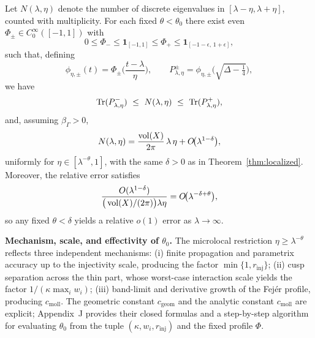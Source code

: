 \begin{theorem}\label{thm:local-weyl}
Let $N(\lambda,\eta)$ denote the number of discrete eigenvalues in $[\lambda-\eta,\lambda+\eta]$, counted with multiplicity. For each fixed $\theta<\theta_0$ there exist even $\Phi_\pm\in C_0^\infty([-1,1])$ with
\[
0\le\Phi_-\le\mathbf{1}_{[-1,1]}\le\Phi_+\le\mathbf{1}_{[-1-\epsilon,\,1+\epsilon]},
\]
such that, defining
\[
\phi_{\eta,\pm}(t)=\Phi_\pm\!\Big(\frac{t-\lambda}{\eta}\Big),\qquad 
P^\pm_{\lambda,\eta}=\phi_{\eta,\pm}\!\Big(\sqrt{\Delta-\tfrac14}\Big),
\]
we have
\begin{equation}\label{eq:tauber}
\Tr(P^-_{\lambda,\eta})\ \le\ N(\lambda,\eta)\ \le\ \Tr(P^+_{\lambda,\eta}),
\end{equation}
and, assuming $\beta_\Gamma>0$,
\begin{equation}\label{eq:local-weyl}
N(\lambda,\eta) = \frac{\operatorname{vol}(X)}{2\pi}\,\lambda\,\eta + O\!\big(\lambda^{1-\delta}\big),
\end{equation}
uniformly for $\eta\in[\lambda^{-\theta},1]$, with the same $\delta>0$ as in Theorem~\ref{thm:localized}. Moreover, the relative error satisfies
\begin{equation}\label{eq:relative}
\frac{O(\lambda^{1-\delta})}{\big(\operatorname{vol}(X)/(2\pi)\big)\lambda\eta} = O\!\big(\lambda^{-\delta+\theta}\big),
\end{equation}
so any fixed $\theta<\delta$ yields a relative $o(1)$ error as $\lambda\to\infty$.
\end{theorem}

\medskip
\noindent\textbf{Mechanism, scale, and effectivity of $\theta_0$.}
The microlocal restriction $\eta\ge\lambda^{-\theta}$ reflects three independent mechanisms:
(i) finite propagation and parametrix accuracy up to the injectivity scale, producing the factor $\min\{1,r_{\mathrm{inj}}\}$;
(ii) cusp separation across the thin part, whose worst-case interaction scale yields the factor $1/(\kappa\max_i w_i)$;
(iii) band-limit and derivative growth of the Fejér profile, producing $c_{\mathrm{moll}}$.
The geometric constant $c_{\mathrm{geom}}$ and the analytic constant $c_{\mathrm{moll}}$ are explicit; Appendix~J provides their closed formulas and a step-by-step algorithm for evaluating $\theta_0$ from the tuple $(\kappa,{w_i},r_{\mathrm{inj}})$ and the fixed profile $\Phi$.

